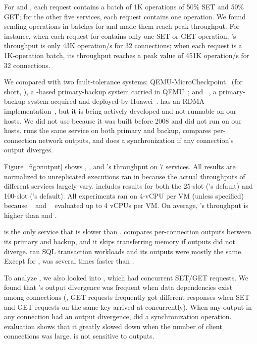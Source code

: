 For \redis and \ssdb, each request contains a batch of 1K operations 
of 50\% SET and 50\% GET; for the other five services, each request contains 
one operation. We found sending operations in batches for \redis and \ssdb made 
them reach peak throughput. For instance, when each request for \redis contains 
only one SET or GET operation, \redis's throughput is only 43K operation/s for 
32 connections; when each request is a 1K-operation batch, its throughput 
reaches a peak value of 451K operation/s for 32 connections.

We compared \yyy with two fault-tolerance systems:
QEMU-MicroCheckpoint~\cite{qemu-mc} (for short, \qemumc),  a \remus-based 
primary-backup system carried in QEMU~\cite{qemu}; and 
\colo~\cite{dong2013colo}, a primary-backup system acquired and deployed by 
Huawei~\cite{fusionsphere}. \qemumc has an RDMA 
implementation~\cite{qemu-mc-rdma}, but it is being actively developed and 
not runnable on our hosts. We did not use \remus because 
it was built before 2008 and did not run on our hosts. \colo runs the same 
service on both primary and backup, compares per-connection network outputs, 
and does a synchronization if any connection's output diverges.

Figure~\ref{fig:vmtput} shows \yyy, \qemumc, and \colo's throughput on 
7 services. All results are normalized to unreplicated executions ran 
in \kvm because the actual throughputs of different services largely vary. 
\qemumc includes results for both the 25\ms-slot (\remus's default) and 
100\ms-slot (\qemumc's default).
All experiments ran on 4-vCPU per VM (unless specified) because 
\colo~\cite{dong2013colo} and \remus~\cite{remus:nsdi08} evaluated up to 4 
vCPUs per VM. On average, \yyy's throughput is \avgtput higher than \qemumc and 
\colo.

\pgsql is the only service that \yyy is slower than \colo. \colo compares 
per-connection outputs between its primary and backup, and it 
skips transferring memory if outputs did not diverge. \pgsql ran SQL 
transaction workloads and its outputs were mostly the same. Except for 
\pgsql, \yyy was several times faster than \colo. 

To analyze \colo, we also looked into \ssdb, which 
had concurrent SET/GET requests. We found that \colo's output divergence 
was frequent when data dependencies exist among connections (\ie, GET 
requests frequently got different responses when SET and GET requests on the 
same key arrived at \ssdb concurrently). When any output in any connection 
had an output divergence, \colo did a synchronization operation. \colo 
evaluation shows that it greatly slowed down when the number of client 
connections was large. \yyy is not sensitive to outputs.

